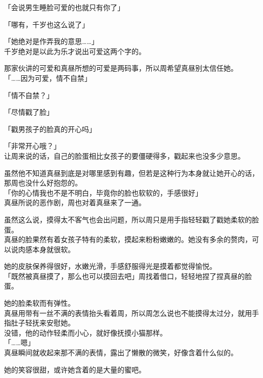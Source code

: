 「会说男生睡脸可爱的也就只有你了」

「哪有，千岁也这么说了」

「她绝对是作弄我的意思……」\\

千岁绝对是以此为乐才说出可爱这两个字的。

那家伙讲的可爱和真昼所想的可爱是两码事，所以周希望真昼别太信任她。\\

「……因为可爱，情不自禁」

「情不自禁？」

「尽情戳了脸」

「戳男孩子的脸真的开心吗」

「非常开心哦？」\\

让周来说的话，自己的脸蛋相比女孩子的要僵硬得多，戳起来也没多少意思。

虽然他不知道真昼到底是对哪里感到有趣，但若是这种行为本身就让她开心的话，那周也没什么好抱怨的。\\

「你的心情我也不是不明白，毕竟你的脸也软软的，手感很好」\\

真昼所说的恶作剧，周也对着真昼来了一通。

虽然这么说，摸得太不客气也会出问题，所以周只是用手指轻轻戳了戳她柔软的脸蛋。\\

真昼的脸果然有着女孩子特有的柔软，摸起来粉粉嫩嫩的。她没有多余的赘肉，可以说肉感本身就很软。

她的皮肤保养得很好，水嫩光滑，手感舒服得光是摸着都觉得愉悦。\\

「既然被真昼摸了，那么也可以摸回去吧」周找着借口，轻轻地捏了捏真昼的脸蛋。

她的脸柔软而有弹性。\\

真昼用带有一丝不满的表情抬头看着周，所以周怎么说也不能摸得太过分，就用手指肚子轻抚来安慰她。\\

没错，他的动作轻柔而小心，就好像抚摸小猫那样。\\

「……嗯」\\

真昼瞬间就收起来那不满的表情，露出了懒散的微笑，好像含着什么似的。

她的笑容很甜，或许她含着的是大量的蜜吧。\\

